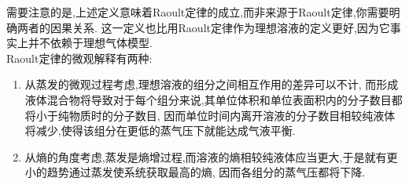 \documentclass{ctexart}
\begin{document}
需要注意的是,上述定义意味着Raoult定律的成立,而非来源于Raoult定律,你需要明确两者的因果关系.%
这一定义也比用Raoult定律作为理想溶液的定义更好,因为它事实上并不依赖于理想气体模型.\\
\indent Raoult定律的微观解释有两种:
\begin{enumerate}[label=\tbf{(\arabic*)},leftmargin=41pt]
    \item 从蒸发的微观过程考虑,理想溶液的组分之间相互作用的差异可以不计,%
        而形成液体混合物将导致对于每个组分来说,其单位体积和单位表面积内的分子数目都将小于纯物质时的分子数目,%
        因而单位时间内离开溶液的分子数目相较纯液体将减少,使得该组分在更低的蒸气压下就能达成气液平衡.
    \item 从熵的角度考虑,蒸发是熵增过程,而溶液的熵相较纯液体应当更大,于是就有更小的趋势通过蒸发使系统获取最高的熵,%
        因而各组分的蒸气压都将下降.
\end{enumerate}
\end{document}
